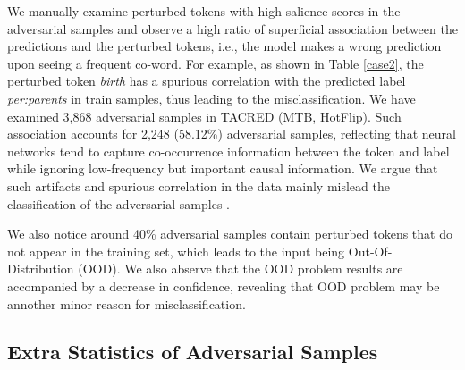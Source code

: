 \documentclass[sigconf]{acmart}
\begin{document}
We manually examine perturbed tokens with high salience scores in the adversarial samples and observe a high ratio of superficial association between the predictions and the perturbed tokens, i.e., the model makes a wrong prediction upon seeing a frequent co-word. For example, as shown in Table \ref{case2}, the perturbed token \emph{birth} has a spurious correlation with the predicted label \emph{per:parents} in train samples, thus leading to the misclassification. We have examined 3,868 adversarial samples in TACRED (MTB, HotFlip). Such association accounts for 2,248 (58.12\%) adversarial samples, reflecting that neural networks tend to capture co-occurrence information between the token and label while ignoring low-frequency but important causal information. We argue that such artifacts and spurious correlation in the data mainly mislead the classification of the adversarial samples \cite{han-etal-2020-explaining}.

We also notice around 40\% adversarial samples contain perturbed tokens that do not appear in the training set, which leads to the input being Out-Of-Distribution (OOD). 
We also abserve that the OOD problem results are accompanied by a decrease in confidence, revealing that OOD problem may be annother minor reason for misclassification.

\subsection{Extra Statistics of Adversarial Samples}
\begin{table}[h]
   \centering 
{}
\caption{Extra statistics of Wiki80 adversarial samples.}
  \label{adv_res_wiki}
\end{table}
\end{document}
